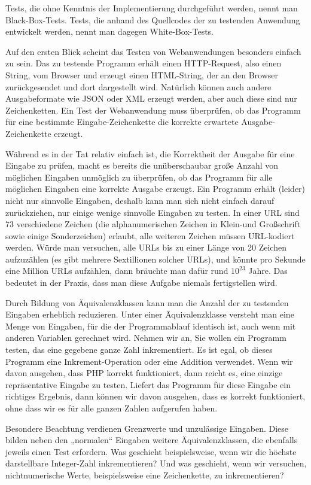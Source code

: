 Tests, die ohne Kenntnis der Implementierung durchgeführt werden, nennt man Black-Box-Tests. Tests, die anhand des Quellcodes der zu testenden Anwendung entwickelt werden, nennt man dagegen White-Box-Tests.

Auf den ersten Blick scheint das Testen von Webanwendungen besonders einfach zu sein.
Das zu testende Programm erhält einen HTTP-Request, also einen String, vom Browser
und erzeugt einen HTML-String, der an den Browser zurückgesendet und dort dargestellt
wird. Natürlich können auch andere Ausgabeformate wie JSON oder XML erzeugt werden,
aber auch diese sind nur Zeichenketten. Ein Test der Webanwendung muss überprüfen, ob
das Programm für eine bestimmte Eingabe-Zeichenkette die korrekte erwartete Ausgabe-
Zeichenkette erzeugt.

Während es in der Tat relativ einfach ist, die Korrektheit der Ausgabe für eine Eingabe zu
prüfen, macht es bereits die unüberschaubar große Anzahl von möglichen Eingaben unmöglich 
zu überprüfen, ob das Programm für alle möglichen Eingaben eine korrekte Ausgabe erzeugt. 
Ein Programm erhält (leider) nicht nur sinnvolle Eingaben, deshalb kann man sich nicht
einfach darauf zurückziehen, nur einige wenige sinnvolle Eingaben zu testen. In einer 
URL sind 73 verschiedene Zeichen (die alphanumerischen Zeichen in Klein-und Großschrift 
sowie einige Sonderzeichen) erlaubt, alle weiteren Zeichen müssen URL-kodiert werden. 
Würde man versuchen, alle URLs bis zu einer Länge von 20 Zeichen aufzuzählen 
(es gibt mehrere Sextillionen solcher URLs), und könnte 
pro Sekunde eine Million URLs aufzählen, dann bräuchte man dafür rund $10^{23}$ Jahre. Das bedeutet 
in der Praxis, dass man diese Aufgabe niemals fertigstellen wird.

Durch Bildung von Äquivalenzklassen kann man die Anzahl der zu testenden Eingaben
erheblich reduzieren. Unter einer Äquivalenzklasse versteht man eine Menge von Eingaben,
für die der Programmablauf identisch ist, auch wenn mit anderen Variablen gerechnet wird. 
Nehmen wir an, Sie wollen ein Programm testen, das eine gegebene ganze Zahl inkrementiert. 
Es ist egal, ob dieses Programm eine Inkrement-Operation oder eine Addition verwendet. Wenn wir davon ausgehen, dass PHP korrekt funktioniert, dann reicht es, eine einzige repräsentative Eingabe zu testen. Liefert das Programm für diese Eingabe ein richtiges Ergebnis, dann können wir davon ausgehen, dass es korrekt funktioniert, ohne dass wir es für alle ganzen Zahlen aufgerufen haben.

Besondere Beachtung verdienen Grenzwerte und unzulässige Eingaben. Diese bilden neben
den „normalen“ Eingaben weitere Äquivalenzklassen, die ebenfalls jeweils einen Test
erfordern. Was geschieht beispielsweise, wenn wir die höchste darstellbare Integer-Zahl 
inkrementieren? Und was geschieht, wenn wir versuchen, nichtnumerische Werte, beispielsweise
eine Zeichenkette, zu inkrementieren?

